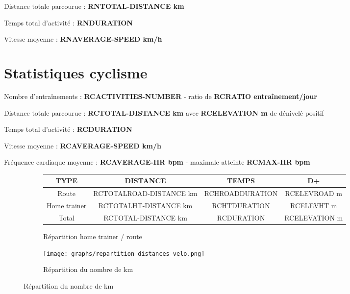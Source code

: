 \documentclass[a4paper,french,11pt]{report}
\begin{document}
\textbullet Distance totale parcourue : \textbf{RNTOTAL-DISTANCE km}

\textbullet Temps total d'activité : \textbf{RNDURATION}

\textbullet Vitesse moyenne : \textbf{RNAVERAGE-SPEED km/h}


\section*{Statistiques cyclisme}
\thispagestyle{empty}

\textbullet Nombre d'entraînements : \textbf{RCACTIVITIES-NUMBER} - ratio de \textbf{RCRATIO entraînement/jour}

\textbullet Distance totale parcourue : \textbf{RCTOTAL-DISTANCE km} avec \textbf{RCELEVATION m} de dénivelé positif

\textbullet Temps total d'activité : \textbf{RCDURATION}

\textbullet Vitesse moyenne : \textbf{RCAVERAGE-SPEED km/h}

\textbullet Fréquence cardiaque moyenne : \textbf{RCAVERAGE-HR bpm} - maximale atteinte \textbf{RCMAX-HR bpm}

\begin{figure}[!ht]
\begin{subfigure}{.49\linewidth}

\centering

\begin{tabular}{|c|c|c|c|}
\hline
\textbf{TYPE}  & \textbf{DISTANCE}       & \textbf{TEMPS}  & \textbf{D+}   \\ \hline
Route          & RCTOTALROAD-DISTANCE km & RCHROADDURATION & RCELEVROAD m  \\ \hline
Home trainer   & RCTOTALHT-DISTANCE km   & RCHTDURATION    & RCELEVHT m    \\ \hline
Total          & RCTOTAL-DISTANCE km     & RCDURATION      & RCELEVATION m \\ \hline
\end{tabular}
\caption*{Répartition home trainer / route}

\end{subfigure}\hfill
\begin{subfigure}{.49\linewidth}

\centering

\texttt{[image: graphs/repartition\_distances\_velo.png]}
\caption*{Répartition du nombre de km}

\end{subfigure}
\end{figure}
\end{document}
